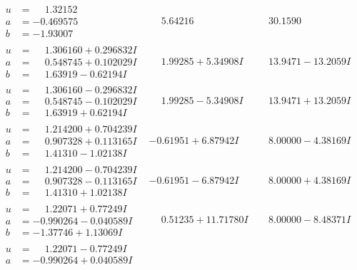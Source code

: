 \documentclass[1p]{elsarticle_modified}
\theoremstyle{definition}
\begin{document}
$$\begin{array}{c|c|c}
\begin{aligned}
u &= \phantom{-}1.32152\phantom{ +0.000000I} \\
a &= -0.469575\phantom{ +0.000000I} \\
b &= -1.93007\phantom{ +0.000000I}\end{aligned}
 & \phantom{-}5.64216\phantom{ +0.000000I} & \phantom{-}30.1590\phantom{ +0.000000I} \\ \hline\begin{aligned}
u &= \phantom{-}1.306160 + 0.296832 I \\
a &= \phantom{-}0.548745 + 0.102029 I \\
b &= \phantom{-}1.63919 - 0.62194 I\end{aligned}
 & \phantom{-}1.99285 + 5.34908 I & \phantom{-}13.9471 - 13.2059 I \\ \hline\begin{aligned}
u &= \phantom{-}1.306160 - 0.296832 I \\
a &= \phantom{-}0.548745 - 0.102029 I \\
b &= \phantom{-}1.63919 + 0.62194 I\end{aligned}
 & \phantom{-}1.99285 - 5.34908 I & \phantom{-}13.9471 + 13.2059 I \\ \hline\begin{aligned}
u &= \phantom{-}1.214200 + 0.704239 I \\
a &= \phantom{-}0.907328 + 0.113165 I \\
b &= \phantom{-}1.41310 - 1.02138 I\end{aligned}
 & -0.61951 + 6.87942 I & \phantom{-}8.00000 - 4.38169 I \\ \hline\begin{aligned}
u &= \phantom{-}1.214200 - 0.704239 I \\
a &= \phantom{-}0.907328 - 0.113165 I \\
b &= \phantom{-}1.41310 + 1.02138 I\end{aligned}
 & -0.61951 - 6.87942 I & \phantom{-}8.00000 + 4.38169 I \\ \hline\begin{aligned}
u &= \phantom{-}1.22071 + 0.77249 I \\
a &= -0.990264 - 0.040589 I \\
b &= -1.37746 + 1.13069 I\end{aligned}
 & \phantom{-}0.51235 + 11.71780 I & \phantom{-}8.00000 - 8.48371 I \\ \hline\begin{aligned}
u &= \phantom{-}1.22071 - 0.77249 I \\
a &= -0.990264 + 0.040589 I \\

\end{aligned}
\end{array}$$
\end{document}
